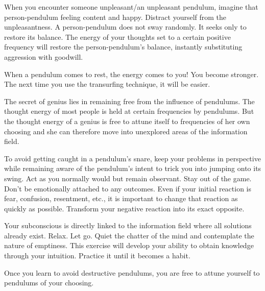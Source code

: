 \documentclass[
  openany]{book}
\begin{document}
When you encounter someone unpleasant/an unpleasant pendulum, imagine that person-pendulum feeling content and happy. Distract yourself from the unpleasantness. A person-pendulum does not sway randomly. It seeks only to restore its balance. The energy of your thoughts set to a certain positive frequency will restore the person-pendulum's balance, instantly substituting aggression with goodwill.

When a pendulum comes to rest, the energy comes to you! You become stronger. The next time you use the transurfing technique, it will be easier.

The secret of genius lies in remaining free from the influence of pendulums. The thought energy of most people is held at certain frequencies by pendulums. But the thought energy of a genius is free to attune itself to frequencies of her own choosing and she can therefore move into unexplored areas of the information field.

To avoid getting caught in a pendulum's snare, keep your problems in perspective while remaining aware of the pendulum's intent to trick you into jumping onto its swing. Act as you normally would but remain observant. Stay out of the game. Don't be emotionally attached to any outcomes. Even if your initial reaction is fear, confusion, resentment, etc., it is important to change that reaction as quickly as possible. Transform your negative reaction into its exact opposite.

Your subconscious is directly linked to the information field where all solutions already exist. Relax. Let go. Quiet the chatter of the mind and contemplate the nature of emptiness. This exercise will develop your ability to obtain knowledge through your intuition. Practice it until it becomes a habit.

Once you learn to avoid destructive pendulums, you are free to attune yourself to pendulums of your choosing.
\end{document}
